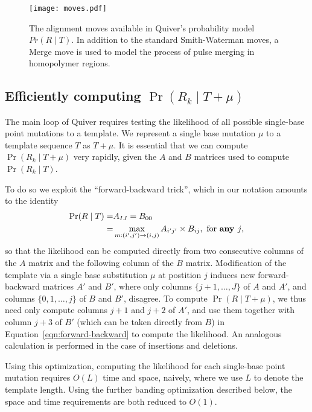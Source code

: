 \documentclass[11pt]{article}
\begin{document}
\begin{figure}[H]
\centering
\texttt{[image: moves.pdf]}
\caption{The alignment moves available in Quiver's probability model
  $Pr(R \mid T)$.  In addition to the standard Smith-Waterman moves, a
  \textsf{Merge} move is used to model the process of pulse merging in
  homopolymer regions.}
\label{fig:Quiver-alignment-moves}
\end{figure}


\subsection{Efficiently computing $\Pr(R_k \mid T + \mu)$ }
The main loop of Quiver requires testing the likelihood of all possible single-base point mutations to a template.  We represent a single base mutation $\mu$ to a template sequence $T$ as $T + \mu$. It is essential that we can compute $\Pr(R_k \mid T + \mu)$ very rapidly, given the $A$ and $B$ matrices used to compute $\Pr(R_k \mid T)$.

To do so we exploit the ``forward-backward trick'', which in our notation amounts to the identity
\begin{align}
  \Pr(R \mid T) =& A_{IJ} = B_{00} \nonumber \\ 
     =& \max_{m: (i',j') \to (i, j)} A_{i'j'} \times B_{ij},
     \text{ for \bf{any} $j$}, \label{eqn:forward-backward} 
\end{align}
so that the likelihood can be computed directly from two consecutive columns of the $A$ matrix and the following column of the $B$ matrix. Modification of the template via a single base substitution $\mu$ at
postition $j$ induces new forward-backward matrices $A'$ and $B'$, where only columns $\{j+1, \ldots, J\}$ of $A$ and $A'$, and columns $\{0, 1, \ldots, j\}$ of $B$ and $B'$, disagree.  To compute $\Pr(R \mid T + \mu)$, we thus need only compute columns $j+1$ and $j+2$ of $A'$, and use them together with column $j+3$ of $B'$ (which can be taken directly from $B$) in Equation~\ref{eqn:forward-backward} to compute the likelihood.  An analogous calculation is performed in the case of insertions and deletions.

Using this optimization, computing the likelihood for each single-base point mutation requires $O(L)$ time and space, naively, where we use $L$ to denote the template length.  Using the further banding optimization described below, the space and time requirements are both reduced to $O(1)$.
\end{document}
